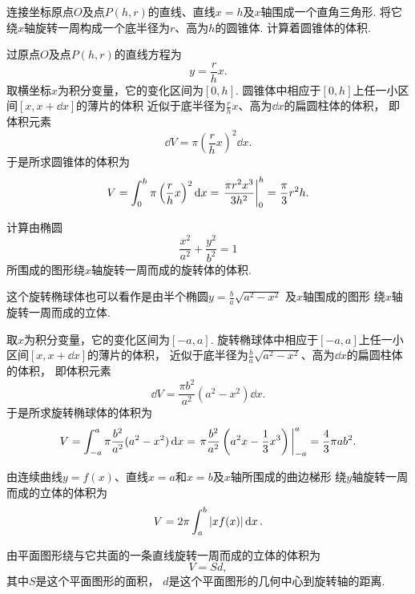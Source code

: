 \begin{example}
连接坐标原点\(O\)及点\(P(h,r)\)的直线、直线\(x=h\)及\(x\)轴围成一个直角三角形.
将它绕\(x\)轴旋转一周构成一个底半径为\(r\)、高为\(h\)的圆锥体.
计算着圆锥体的体积.
\begin{solution}
过原点\(O\)及点\(P(h,r)\)的直线方程为\[
	y = \frac{r}{h} x.
\]
取横坐标\(x\)为积分变量，它的变化区间为\([0,h]\).
圆锥体中相应于\([0,h]\)上任一小区间\([x,x+\dd{x}]\)的薄片的体积
近似于底半径为\(\frac{r}{h} x\)、高为\(\dd{x}\)的扁圆柱体的体积，
即体积元素\[
	\dd{V} = \pi \left(\frac{r}{h} x\right)^2 \dd{x}.
\]
于是所求圆锥体的体积为\[
	V = \int_0^h \pi \left(\frac{r}{h} x\right)^2 \dd{x}
	= \eval{\frac{\pi r^2 x^3}{3 h^2}}_0^h
	= \frac\pi3 r^2 h.
\]
\end{solution}
\end{example}

\begin{example}
计算由椭圆\[
	\frac{x^2}{a^2}+\frac{y^2}{b^2}=1
\]所围成的图形绕\(x\)轴旋转一周而成的旋转体的体积.
\begin{solution}
这个旋转椭球体也可以看作是由半个椭圆\(y = \frac{b}{a} \sqrt{a^2-x^2}\)
及\(x\)轴围成的图形
绕\(x\)轴旋转一周而成的立体.

取\(x\)为积分变量，它的变化区间为\([-a,a]\).
旋转椭球体中相应于\([-a,a]\)上任一小区间\([x,x+\dd{x}]\)的薄片的体积，
近似于底半径为\(\frac{b}{a} \sqrt{a^2-x^2}\)、高为\(\dd{x}\)的扁圆柱体的体积，
即体积元素\[
	\dd{V} = \frac{\pi b^2}{a^2} (a^2-x^2) \dd{x}.
\]
于是所求旋转椭球体的体积为\[
	V = \int_{-a}^a \pi \frac{b^2}{a^2} (a^2-x^2) \dd{x}
	= \eval{\pi \frac{b^2}{a^2} \left(a^2x-\frac13x^3\right)}_{-a}^a
	= \frac43 \pi a b^2.
\]
\end{solution}
\end{example}

由连续曲线\(y=f(x)\)、直线\(x=a\)和\(x=b\)及\(x\)轴所围成的曲边梯形
绕\(y\)轴旋转一周而成的立体的体积为
\begin{equation}\label{equation:定积分.曲边梯形绕y轴旋转体的体积}
	V = 2\pi \int_a^b \abs{x f(x)} \dd{x}.
\end{equation}

\begin{theorem}[古尔丁体积定理]
由平面图形绕与它共面的一条直线旋转一周而成的立体的体积为\begin{equation}
	V = S d,
\end{equation}
其中\(S\)是这个平面图形的面积，
\(d\)是这个平面图形的几何中心到旋转轴的距离.
\end{theorem}

